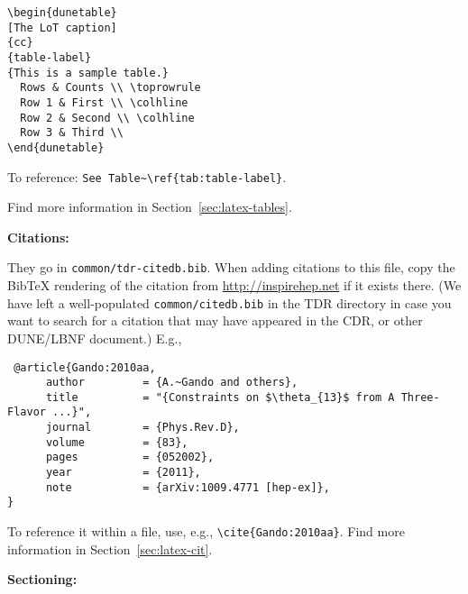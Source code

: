 \begin{framed}
\begin{verbatim}
\begin{dunetable}
[The LoT caption]
{cc}
{table-label}
{This is a sample table.}
  Rows & Counts \\ \toprowrule
  Row 1 & First \\ \colhline
  Row 2 & Second \\ \colhline
  Row 3 & Third \\ 
\end{dunetable}
\end{verbatim}
To reference: \verb|See Table~\ref{tab:table-label}|.

Find more information in Section~\ref{sec:latex-tables}.
\end{framed}
\textbf{Citations:}
\begin{framed}
They go in \texttt{common/tdr-citedb.bib}. When adding citations to this file, copy the BibTeX rendering of the citation from \url{http://inspirehep.net} if it exists there. (We have left a well-populated \texttt{common/citedb.bib} in the TDR directory in case you want to search for a citation
 that may have appeared in the CDR, or other DUNE/LBNF document.) E.g.,

\begin{verbatim}
 @article{Gando:2010aa,
      author         = {A.~Gando and others},
      title          = "{Constraints on $\theta_{13}$ from A Three-Flavor ...}",
      journal        = {Phys.Rev.D},
      volume         = {83},
      pages          = {052002},
      year           = {2011},
      note           = {arXiv:1009.4771 [hep-ex]},
}
\end{verbatim}
 To reference it within a file, use, e.g.,  \verb|\cite{Gando:2010aa}|.
Find more information in Section~\ref{sec:latex-cit}.
\end{framed}

\textbf{Sectioning:}

